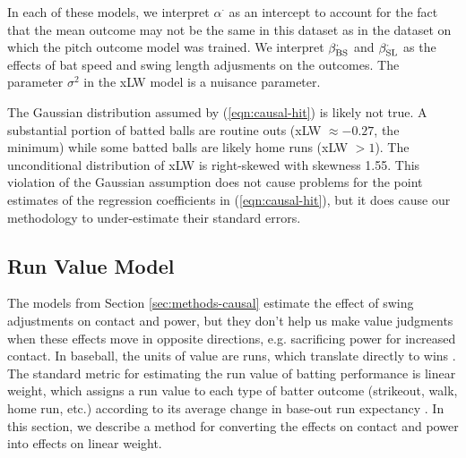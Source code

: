 \documentclass[
  12pt]{article}
\begin{document}
      In each of these models, we interpret $\alpha^\cdot$ as an intercept to account for the fact that the mean outcome may not be the same in this dataset as in the dataset on which the pitch outcome model was trained. We interpret $\beta_{\mbox{\scriptsize BS}}^{\cdot}$ and $\beta_{\mbox{\scriptsize SL}}^{\cdot}$ as the effects of bat speed and swing length adjusments on the outcomes. The parameter $\sigma^2$ in the xLW model is a nuisance parameter.

      The Gaussian distribution assumed by (\ref{eqn:causal-hit}) is likely not true. A substantial portion of batted balls are routine outs (xLW $\approx -0.27$, the minimum) while some batted balls are likely home runs (xLW $> 1$). The unconditional distribution of xLW is right-skewed with skewness 1.55. This violation of the Gaussian assumption does not cause problems for the point estimates of the regression coefficients in (\ref{eqn:causal-hit}), but it does cause our methodology to under-estimate their standard errors.

    \subsection{Run Value Model}
    \label{sec:methods-value}

      The models from Section \ref{sec:methods-causal} estimate the effect of swing adjustments on contact and power, but they don't help us make value judgments when these effects move in opposite directions, e.g. sacrificing power for increased contact. In baseball, the units of value are runs, which translate directly to wins \citep{james_bill_1983}. The standard metric for estimating the run value of batting performance is linear weight, which assigns a run value to each type of batter outcome (strikeout, walk, home run, etc.) according to its average change in base-out run expectancy \citep{thorn_hidden_1984}. In this section, we describe a method for converting the effects on contact and power into effects on linear weight.
\end{document}
